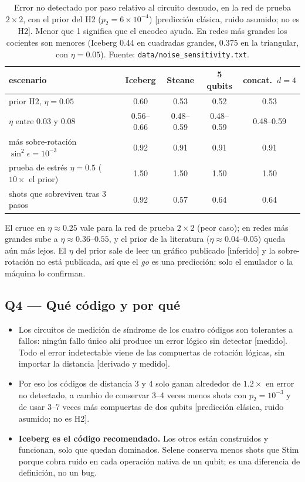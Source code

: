\documentclass[11pt,a4paper]{article}
\newcommand{\code}[1]{\nolinkurl{#1}}
\newcommand{\pred}{\textsf{\small[predicci\'on cl\'asica, ruido asumido; no es H2]}}
\begin{document}
\begin{table}[h]\centering\small
\caption{Error no detectado por paso relativo al circuito desnudo, en la red de prueba $2\times2$,
con el prior del H2 ($p_2=6\times10^{-4}$) \pred. Menor que 1 significa que el encodeo ayuda. En
redes m\'as grandes los cocientes son menores (Iceberg 0.44 en cuadradas grandes, 0.375 en la
triangular, con $\eta=0.05$). Fuente: \code{data/noise\_sensitivity.txt}.}
\begin{tabular}{lcccc}
\toprule
escenario & Iceberg & Steane & 5 qubits & concat.\ $d=4$\\
\midrule
prior H2, $\eta=0.05$ & $\mathbf{0.60}$ & 0.53 & 0.52 & 0.53\\
$\eta$ entre 0.03 y 0.08 & 0.56--0.66 & 0.48--0.59 & 0.48--0.59 & 0.48--0.59\\
m\'as sobre-rotaci\'on $\sin^2\epsilon=10^{-3}$ & 0.92 & 0.91 & 0.91 & 0.91\\
prueba de estr\'es $\eta=0.5$ ($10\times$ el prior) & 1.50 & 1.50 & 1.50 & 1.50\\
\midrule
shots que sobreviven tras 3 pasos & 0.92 & 0.57 & 0.64 & 0.64\\
\bottomrule
\end{tabular}
\end{table}
\noindent El cruce en $\eta\approx0.25$ vale para la red de prueba $2\times2$ (peor caso); en redes m\'as grandes
sube a $\eta\approx0.36$--$0.55$, y el prior de la literatura ($\eta\approx0.04$--$0.05$) queda a\'un m\'as lejos.
El $\eta$ del prior sale de leer un gr\'afico publicado [inferido] y la sobre-rotaci\'on no est\'a publicada,
as\'i que el \emph{go} es una predicci\'on; solo el emulador o la m\'aquina lo confirman.

\subsection{Q4 --- Qu\'e c\'odigo y por qu\'e}
\begin{itemize}[leftmargin=1.4em]
  \item Los circuitos de medici\'on de s\'indrome de los cuatro c\'odigos son tolerantes a fallos: ning\'un
    fallo \'unico ah\'i produce un error l\'ogico sin detectar [medido]. Todo el error indetectable viene
    de las compuertas de rotaci\'on l\'ogicas, sin importar la distancia [derivado y medido].
  \item Por eso los c\'odigos de distancia 3 y 4 solo ganan alrededor de $1.2\times$ en error no
    detectado, a cambio de conservar 3--4 veces menos shots con $p_2=10^{-3}$ y de usar 3--7 veces m\'as
    compuertas de dos qubits \pred.
  \item \textbf{Iceberg es el c\'odigo recomendado.} Los otros est\'an construidos y funcionan, solo que
    quedan dominados. Selene conserva menos shots que Stim porque cobra ruido en cada operaci\'on nativa de
    un qubit; es una diferencia de definici\'on, no un bug.
\end{itemize}
\end{document}
